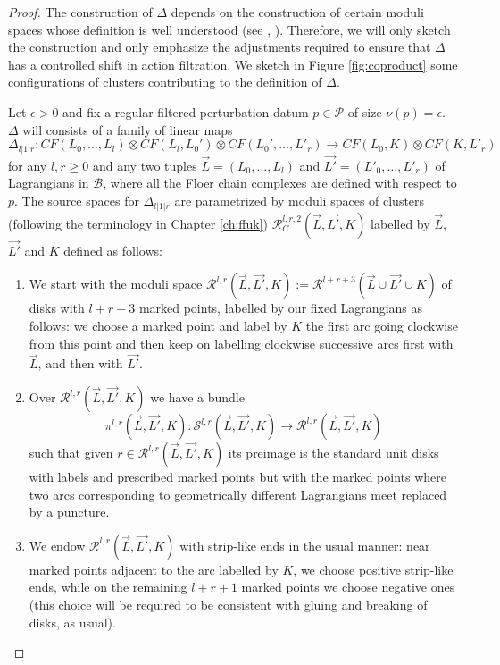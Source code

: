 \begin{proof}
The construction of $\Delta$ depends on the construction of certain moduli spaces whose definition is 
well understood (see \cite{Ab:geom-crit}, \cite{she:fanofuk}). Therefore, we will only sketch the construction and only emphasize the adjustments required to ensure that $\Delta$ has a controlled shift in action filtration. We sketch in Figure \ref{fig:coproduct} some configurations of clusters contributing to the definition of $\Delta$. 

	

 Let $\epsilon>0$ and fix a regular filtered perturbation datum $p\in \mathcal{P}$ of size $\nu(p)=\epsilon$. $\Delta$ will consists of a family of linear maps $$\Delta_{l|1|r}\colon CF(L_0,\ldots, L_l)\otimes CF(L_l,L_0')\otimes CF(L_0',\ldots, L'_r)\to CF(L_0,K)\otimes CF(K,L'_r)$$ for any $l,r\geq 0$ and any two tuples $\vec{L}=(L_0,\ldots, L_l)$ and $\vec{L'}=(L'_0,\ldots, L'_r)$ of Lagrangians in $\mathcal{B}$, where all the Floer chain complexes are defined with respect to $p$. The source spaces for $\Delta_{l|1|r}$ are parametrized by  moduli spaces of clusters (following the terminology in  Chapter \ref{ch:ffuk}) $\mathcal{R}^{l,r,2}_C(\vec{L},\vec{L'},K)$ labelled by $\vec{L}$, $\vec{L'}$ and $K$ defined as follows:
\begin{enumerate}
	\item We start with the moduli space $\mathcal{R}^{l,r}(\vec{L},\vec{L'},K):=\mathcal{R}^{l+r+3}(\vec{L}\cup\vec{L'}\cup K)$ of disks with $l+r+3$ marked points, labelled by our fixed Lagrangians as follows: we choose a marked point and label by $K$ the first arc going clockwise from this point and then keep on labelling clockwise successive arcs first with $\vec{L}$, and then with $\vec{L'}$.
	\item Over $\mathcal{R}^{l,r}(\vec{L},\vec{L'},K)$ we have a bundle $$\pi^{l,r}(\vec{L},\vec{L'},K)\colon \mathcal{S}^{l,r}(\vec{L},\vec{L'},K)\to \mathcal{R}^{l,r}(\vec{L},\vec{L'},K)$$ such that given $r\in \mathcal{R}^{l,r}(\vec{L},\vec{L'},K)$ its preimage is the standard unit disks with labels and prescribed marked points but with the marked points where two arcs corresponding to geometrically different Lagrangians meet replaced by a puncture.
	\item We endow $\mathcal{R}^{l,r}(\vec{L},\vec{L'},K)$ with strip-like ends in the usual manner: near marked points adjacent to the arc labelled by $K$, we choose positive strip-like ends, while on the remaining $l+r+1$ marked points we choose negative ones (this choice will be required to be consistent with gluing and breaking of disks, as usual).

\end{enumerate}
\end{proof}
